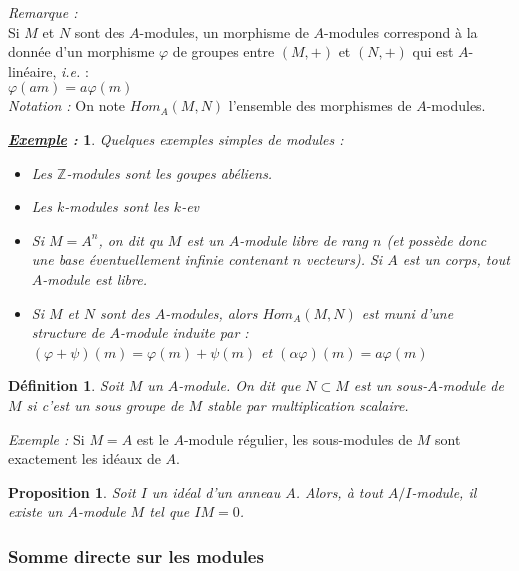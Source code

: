 \documentclass{article}           %
\newcommand\Z{\mathbb{Z}}
\theoremstyle{break}
\theoremstyle{add}
\theoremstyle{break} %
\newtheorem{definition}{Définition}[section]
\newtheorem{proposition}{Proposition}[section]
\theoremstyle{add}
\newtheorem*{exemple}{\textit{\underline{Exemple} :}}
\begin{document}
\textit{Remarque :} \\
Si $M$ et $N$ sont des $A$-modules, un morphisme de $A$-modules correspond à la donnée d'un morphisme $\varphi$ de groupes entre $(M,+)$ et $(N,+)$ qui est $A$-linéaire, \textit{i.e.} :\\  $\varphi(am) = a \varphi(m)$ \\

\textit{Notation :}
On note $Hom_A(M,N)$ l'ensemble des morphismes de $A$-modules. \\

\begin{exemple}
Quelques exemples simples de modules : 
\begin{itemize}
\item Les $\Z$-modules sont les goupes abéliens. 
\item Les $k$-modules sont les $k$-ev
\item Si $M=A^n$, on dit qu $M$ est un $A$-module libre de rang $n$ (et possède donc une base éventuellement infinie contenant $n$ vecteurs). Si $A$ est un corps, tout $A$-module est libre.
\item Si $M$ et $N$ sont des $A$-modules, alors $Hom_A(M,N)$ est muni d'une structure de $A$-module induite par : \\
$(\varphi + \psi)(m) = \varphi(m) + \psi(m)$ et $(\alpha \varphi)(m) = a \varphi(m)$
\end{itemize}
\end{exemple}

\begin{definition}
Soit $M$ un $A$-module. On dit que $N \subset M$ est un sous-$A$-module de $M$ si c'est un sous groupe de $M$ stable par multiplication scalaire.
\end{definition}

\textit{Exemple :}
Si $M=A$ est le $A$-module régulier, les sous-modules de $M$ sont exactement les idéaux de $A$. \\

\begin{proposition}
Soit $I$ un idéal d'un anneau $A$.
Alors, à tout $A/I$-module, il existe un $A$-module $M$ tel que $IM = 0$.
\end{proposition}

\subsubsection{Somme directe sur les modules}
\end{document}
